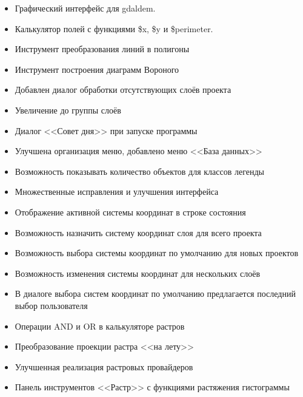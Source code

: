 
\begin{itemize}[label=--]
\item Графический интерфейс для gdaldem.
\item Калькулятор полей с функциями \$x, \$y и \$perimeter.
\item Инструмент преобразования линий в полигоны
\item Инструмент построения диаграмм Вороного
\end{itemize}


\begin{itemize}[label=--]
\item Добавлен диалог обработки отсутствующих слоёв проекта
\item Увеличение до группы слоёв
\item Диалог <<Совет дня>> при запуске программы
\item Улучшена организация меню, добавлено меню <<База данных>>
\item Возможность показывать количество объектов для классов легенды
\item Множественные исправления и улучшения интерфейса
\end{itemize}


\begin{itemize}[label=--]
\item Отображение активной системы координат в строке состояния
\item Возможность назначить систему координат слоя для всего проекта
\item Возможность выбора системы координат по умолчанию для новых проектов
\item Возможность изменения системы координат для нескольких слоёв
\item В диалоге выбора систем координат по умолчанию предлагается последний
выбор пользователя
\end{itemize}


\begin{itemize}[label=--]
\item Операции AND и OR в калькуляторе растров
\item Преобразование проекции растра <<на лету>>
\item Улучшенная реализация растровых провайдеров
\item Панель инструментов <<Растр>> с функциями растяжения гистограммы
\end{itemize}

